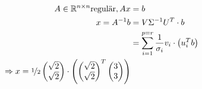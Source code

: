 \begin{equation}\begin{split}
    A\in {\mathbb R}^{n\times n} \text{regulär}, Ax &= b\\
    x = A^{-1} b &= V\Sigma^{-1}U^T\cdot b\\
    &=\sum_{i=1}^{p=r}\frac{1}{\sigma_i} v_i \cdot \left(u_i^Tb\right)\\
    \Rightarrow 
    x = 
    \nicefrac{1}{2}
    \begin{pmatrix}
	    \sqrt{2}\\\sqrt{2}
    \end{pmatrix}
    \cdot 
    \left(
   		\begin{pmatrix}
   			\sqrt{2}\\\sqrt{2}
   		\end{pmatrix}^T
   		\begin{pmatrix}
	   		3\\3
   		\end{pmatrix}
	\right)
\end{split}\end{equation}











